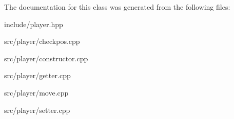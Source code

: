The documentation for this class was generated from the following files\+:\begin{DoxyCompactItemize}
\item 
include/player.\+hpp\item 
src/player/checkpos.\+cpp\item 
src/player/constructor.\+cpp\item 
src/player/getter.\+cpp\item 
src/player/move.\+cpp\item 
src/player/setter.\+cpp\end{DoxyCompactItemize}
